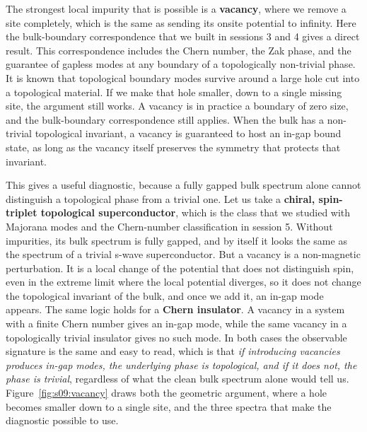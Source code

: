 The strongest local impurity that is possible is a \textbf{vacancy}, where we remove a site
completely, which is the same as sending its onsite potential to infinity. Here the bulk-boundary
correspondence that we built in sessions 3 and 4 gives a direct result. This correspondence includes
the Chern number, the Zak phase, and the guarantee of gapless modes at any boundary of a
topologically non-trivial phase. It is known that topological boundary modes survive around a large
hole cut into a topological material. If we make that hole smaller, down to a single missing site,
the argument still works. A vacancy is in practice a boundary of zero size, and the bulk-boundary
correspondence still applies. When the bulk has a non-trivial topological invariant, a vacancy is
guaranteed to host an in-gap bound state, as long as the vacancy itself preserves the symmetry that
protects that invariant.

This gives a useful diagnostic, because a fully gapped bulk spectrum alone cannot distinguish a
topological phase from a trivial one. Let us take a \textbf{chiral, spin-triplet topological
superconductor}, which is the class that we studied with Majorana modes and the Chern-number
classification in session 5. Without impurities, its bulk spectrum is fully gapped, and by itself it
looks the same as the spectrum of a trivial s-wave superconductor. But a vacancy is a non-magnetic
perturbation. It is a local change of the potential that does not distinguish spin, even in the
extreme limit where the local potential diverges, so it does not change the topological invariant of
the bulk, and once we add it, an in-gap mode appears. The
same logic holds for a \textbf{Chern insulator}. A vacancy in a system with a finite Chern number gives
an in-gap mode, while the same vacancy in a topologically trivial insulator gives no such mode. In
both cases the observable signature is the same and easy to read, which is that \emph{if introducing
vacancies produces in-gap modes, the underlying phase is topological, and if it does not, the phase is
trivial}, regardless of what the clean bulk spectrum alone would tell us.
Figure~\ref{fig:s09:vacancy} draws both the geometric argument, where a hole becomes smaller down to
a single site, and the three spectra that make the diagnostic possible to use.



